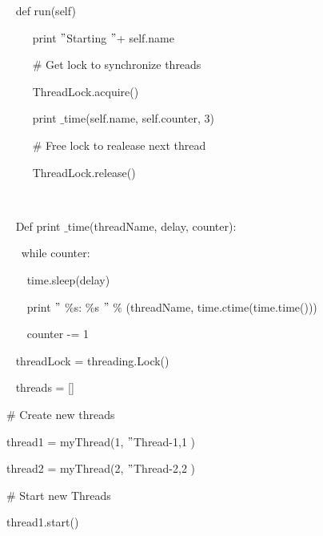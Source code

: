 \documentclass{wileySix}
\begin{document}
\noindent 
{\fontsize{10pt}{10pt}\selectfont ~ def run(self)} \par
\noindent 
{\fontsize{10pt}{10pt}\selectfont ~~~~ print  $ " $Starting  $ " $+ self.name} \par
\noindent 
{\fontsize{10pt}{10pt}\selectfont ~~~~  $  \#  $ Get lock to synchronize threads} \par
\noindent 
{\fontsize{10pt}{10pt}\selectfont ~~~~ ThreadLock.acquire()} \par
\noindent 
{\fontsize{10pt}{10pt}\selectfont ~~~~ print $  \_  $time(self.name, self.counter, 3)} \par
\noindent 
{\fontsize{10pt}{10pt}\selectfont ~~~~  $  \#  $ Free lock to realease next thread} \par
\noindent 
{\fontsize{10pt}{10pt}\selectfont ~~~~ ThreadLock.release()} \par
\noindent 
{\fontsize{10pt}{10pt}\selectfont ~ } \par
\noindent 
{\fontsize{10pt}{10pt}\selectfont ~ Def print $  \_  $time(threadName, delay, counter):} \par
\noindent 
{\fontsize{10pt}{10pt}\selectfont ~~ while counter:} \par
\noindent 
{\fontsize{10pt}{10pt}\selectfont ~~~ time.sleep(delay)} \par
\noindent 
{\fontsize{10pt}{10pt}\selectfont ~~~ print  $ " $ $  \%  $s:  $  \%  $s $ " $  $  \%  $ (threadName, time.ctime(time.time()))} \par
\noindent 
{\fontsize{10pt}{10pt}\selectfont ~~~ counter -= 1} \par
\noindent 
{\fontsize{10pt}{10pt}\selectfont ~ threadLock = threading.Lock()} \par
\noindent 
{\fontsize{10pt}{10pt}\selectfont ~ threads = []} \par
\vspace{10pt}
\noindent 
{\fontsize{10pt}{10pt}\selectfont  $  \#  $ Create new threads} \par
\noindent 
{\fontsize{10pt}{10pt}\selectfont thread1 = myThread(1,  $ " $Thread-1,1 )} \par
\noindent 
{\fontsize{10pt}{10pt}\selectfont thread2 = myThread(2,  $ " $Thread-2,2 )} \par
\vspace{10pt}
\noindent 
{\fontsize{10pt}{10pt}\selectfont  $  \#  $ Start new Threads} \par
\noindent 
{\fontsize{10pt}{10pt}\selectfont thread1.start()} \par
\noindent 
\end{document}
